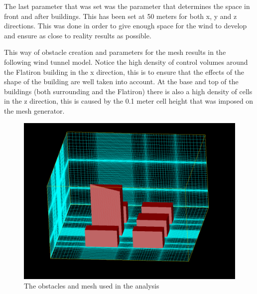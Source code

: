 The last parameter that was set was the parameter that determines the space in front and after buildings. This has been set at 50 meters for both x, y and z directions. This was done in order to give enough space for the wind to develop and ensure as close to reality results as possible.

This way of obstacle creation and parameters for the mesh results in the following wind tunnel model. Notice the high density of control volumes around the Flatiron building in the x direction, this is to ensure that the effects of the shape of the building are well taken into account. At the base and top of the buildings (both surrounding and the Flatiron) there is also a high density of cells in the z direction, this is caused by the 0.1 meter cell height that was imposed on the mesh generator. 
\begin{figure}[ht!]
\centering
\includegraphics[width = \textwidth]{mesh.png}
\caption{The obstacles and mesh used in the analysis}
\label{fig:mesh}
\end{figure}